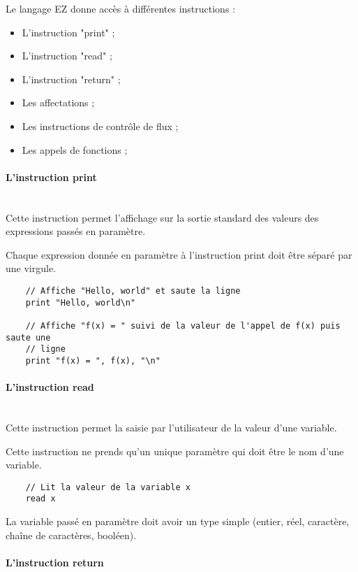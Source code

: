 Le langage EZ donne accès à différentes instructions :
\begin{itemize}
    \item L'instruction "print" ;
    \item L'instruction "read" ;
    \item L'instruction "return" ;
    \item Les affectations ;
    \item Les instructions de contrôle de flux ;
    \item Les appels de fonctions ;
\end{itemize}

\paragraph{L'instruction print}\mbox{} \\

Cette instruction permet l'affichage sur la sortie standard des valeurs
des expressions passés en paramètre.

Chaque expression donnée en paramètre à l'instruction print doit être séparé
par une virgule.

\begin{verbatim}
    // Affiche "Hello, world" et saute la ligne
    print "Hello, world\n"

    // Affiche "f(x) = " suivi de la valeur de l'appel de f(x) puis saute une
    // ligne
    print "f(x) = ", f(x), "\n"
\end{verbatim}


\paragraph{L'instruction read}\mbox{} \\

Cette instruction permet la saisie par l'utilisateur de la valeur d'une
variable.

Cette instruction ne prends qu'un unique paramètre qui doit être le nom d'une
variable.

\begin{verbatim}
    // Lit la valeur de la variable x
    read x
\end{verbatim}

La variable passé en paramètre doit avoir un type simple (entier, réel,
caractère, chaîne de caractères, booléen).


\paragraph{L'instruction return}\mbox{} \\

